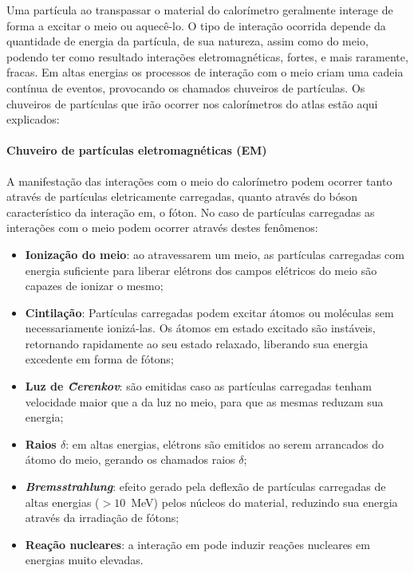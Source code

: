 Uma partícula ao transpassar o material do calorímetro geralmente interage de
forma a excitar o meio ou aquecê-lo. O tipo de interação ocorrida depende da
quantidade de energia da partícula, de sua natureza, assim como do
meio, podendo ter como resultado interações eletromagnéticas, fortes, e mais 
raramente, fracas. Em altas energias os processos de interação com o meio 
criam uma cadeia contínua de eventos, provocando os chamados chuveiros de partículas. 
Os chuveiros de partículas que irão ocorrer nos calorímetros do \gls{atlas} 
estão aqui explicados:

\paragraph{Chuveiro de partículas eletromagnéticas (EM)}
\label{par:chuveiro_em}

A manifestação das interações  com o meio do calorímetro 
podem ocorrer tanto através de partículas eletricamente carregadas, 
quanto através do bóson característico da interação
\gls{em}, o fóton. No caso de partículas carregadas 
as interações com o meio podem ocorrer através destes fenômenos:

\begin{itemize}
\item \textbf{Ionização do meio}: ao atravessarem um meio, as partículas
carregadas com energia suficiente para liberar elétrons dos campos elétricos do
meio são capazes de ionizar o mesmo;
\item \textbf{Cintilação}: Partículas carregadas podem excitar átomos ou
moléculas sem necessariamente ionizá-las. Os átomos em estado excitado são
instáveis, retornando rapidamente ao seu estado relaxado, liberando sua energia
excedente em forma de fótons;
\item \textbf{Luz de \emph{\~Cerenkov}}: são emitidas caso as partículas carregadas tenham
velocidade maior que a da luz no meio, para que as mesmas reduzam sua energia;
\item \textbf{Raios $\delta$}: em altas energias, elétrons são emitidos ao serem
arrancados do átomo do meio, gerando os chamados raios $\delta$;
\item \textbf{\emph{Bremsstrahlung}}: efeito gerado pela deflexão de partículas
carregadas de altas energias ($>10$~MeV) pelos núcleos do material, reduzindo sua energia 
através da irradiação de fótons;
\item \textbf{Reação nucleares}: a interação \gls{em} pode induzir
reações nucleares em energias muito elevadas.
\end{itemize}

